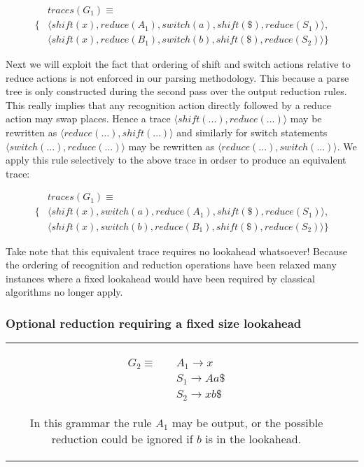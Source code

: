 \documentclass[a4paper,11pt]{article}
\begin{document}
\parbox{.25\textwidth}{\begin{align*}
&traces(G_1) \equiv \\
\{ & \langle shift(x), reduce(A_1), switch(a), shift(\$), reduce(S_1) \rangle,\\
   & \langle shift(x), reduce(B_1), switch(b), shift(\$), reduce(S_2) \rangle \}
\end{align*}}

Next we will exploit the fact that ordering of shift and switch actions relative to reduce actions is not enforced in our parsing methodology. This because a parse tree is only constructed during the second pass over the output reduction rules.
This really implies that any recognition action directly followed by a reduce action may swap places. 
Hence a trace $\langle shift(...), reduce(...) \rangle$ may be rewritten as $\langle reduce(...), shift(...) \rangle$ and similarly for switch statements $\langle switch(...), reduce(...) \rangle$ may be rewritten as $\langle reduce(...), switch(...) \rangle$.
We apply this rule selectively to the above trace in ordser to produce an equivalent trace:

\parbox{.3\textwidth}{\begin{align*}
&traces(G_1) \equiv \\
\{ & \langle shift(x), switch(a), reduce(A_1), shift(\$), reduce(S_1) \rangle, \\
   & \langle shift(x), switch(b), reduce(B_1), shift(\$), reduce(S_2) \rangle \}
\end{align*}}

Take note that this equivalent trace requires no lookahead whatsoever! 
Because the ordering of recognition and reduction operations have been relaxed many instances where a fixed lookahead would have been required by classical algorithms no longer apply.

\subsubsection{Optional reduction requiring a fixed size lookahead}
\begin{tabular}[t]{cl}
\parbox{.3\textwidth}{
\begin{align*}
G_2 \equiv \quad & A_1 \rightarrow x\\
                 & S_1 \rightarrow A a \$\\
                 & S_2 \rightarrow x b \$
\end{align*}}
\parbox{.8\textwidth}{In this grammar the rule $A_1$ may be output, or the possible reduction could be ignored if $b$ is in the lookahead.}
\end{tabular}
\end{document}

